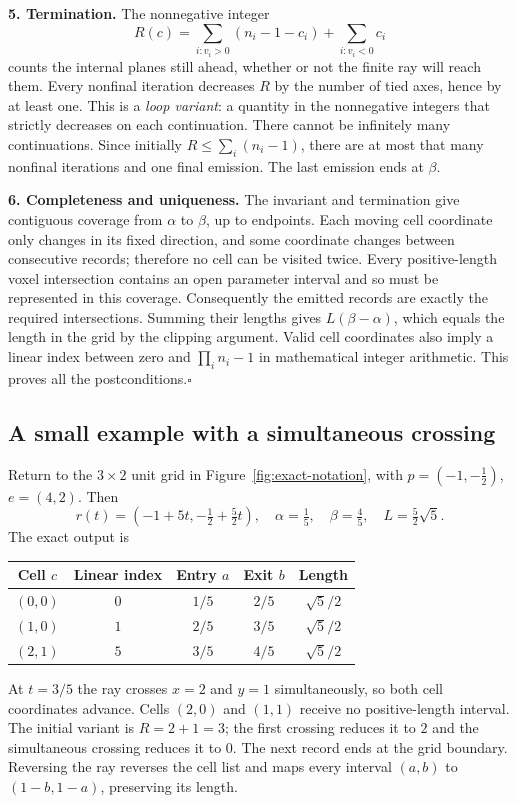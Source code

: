 \textbf{5. Termination.}
The nonnegative integer
\[
 R(c)=\sum_{i:v_i>0}(n_i-1-c_i)+\sum_{i:v_i<0}c_i
\]
counts the internal planes still ahead, whether or not the finite ray will
reach them. Every nonfinal iteration decreases $R$ by the number of tied
axes, hence by at least one. This is a \emph{loop variant}: a quantity in
the nonnegative integers that strictly decreases on each continuation.
There cannot be infinitely many continuations. Since initially
$R\leq\sum_i(n_i-1)$, there are at most that many nonfinal iterations
and one final emission. The last emission ends at $\beta$.

\textbf{6. Completeness and uniqueness.}
The invariant and termination give contiguous coverage from $\alpha$ to
$\beta$, up to endpoints. Each moving cell coordinate only changes in its
fixed direction, and some coordinate changes between consecutive records;
therefore no cell can be visited twice. Every positive-length voxel
intersection contains an open parameter interval and so must be represented
in this coverage. Consequently the emitted records are exactly the required
intersections. Summing their lengths gives $L(\beta-\alpha)$, which equals
the length in the grid by the clipping argument. Valid cell coordinates
also imply a linear index between zero and $\prod_i n_i-1$ in mathematical
integer arithmetic. This proves all the postconditions.\hfill$\square$

\subsection{A small example with a simultaneous crossing}
Return to the $3\times2$ unit grid in Figure~\ref{fig:exact-notation}, with
$p=(-1,-\tfrac12)$, $e=(4,2)$. Then
\[
 r(t)=(-1+5t,-\tfrac12+\tfrac52 t),\quad
 \alpha=\tfrac15,\quad\beta=\tfrac45,\quad L=\tfrac52\sqrt5.
\]
The exact output is
\begin{center}
\begin{tabular}{ccccc}
\toprule
Cell $c$ & Linear index & Entry $a$ & Exit $b$ & Length\\
\midrule
$(0,0)$ & $0$ & $1/5$ & $2/5$ & $\sqrt5/2$\\
$(1,0)$ & $1$ & $2/5$ & $3/5$ & $\sqrt5/2$\\
$(2,1)$ & $5$ & $3/5$ & $4/5$ & $\sqrt5/2$\\
\bottomrule
\end{tabular}
\end{center}
At $t=3/5$ the ray crosses $x=2$ and $y=1$ simultaneously, so both cell
coordinates advance. Cells $(2,0)$ and $(1,1)$ receive no positive-length
interval. The initial variant is $R=2+1=3$; the first crossing reduces it
to $2$ and the simultaneous crossing reduces it to $0$. The next record
ends at the grid boundary. Reversing the ray reverses the cell list and
maps every interval $(a,b)$ to $(1-b,1-a)$, preserving its length.

